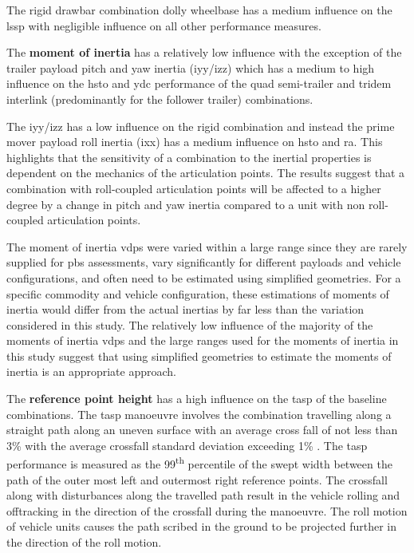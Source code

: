 The rigid drawbar combination dolly wheelbase has a medium influence on the \gls{lssp} with negligible influence on all other performance measures.

The \textbf{moment of inertia} has a relatively low influence with the exception of the trailer payload pitch and yaw inertia (\gls{iyy}/\gls{izz}) which has a medium to high influence on the \gls{hsto} and \gls{ydc} performance of the quad semi-trailer and tridem interlink (predominantly for the follower trailer) combinations. 

The \gls{iyy}/\gls{izz} has a low influence on the rigid combination and instead the prime mover payload roll inertia (\gls{ixx}) has a medium influence on \gls{hsto} and \gls{ra}. This highlights that the sensitivity of a combination to the inertial properties is dependent on the mechanics of the articulation points. The results suggest that a combination with roll-coupled articulation points will be affected to a higher degree by a change in pitch and yaw inertia compared to a unit with non roll-coupled articulation points.

The moment of inertia \glspl{vdp} were varied within a large range since they are rarely supplied for \gls{pbs} assessments, vary significantly for different payloads and vehicle configurations, and often need to be estimated using simplified geometries. For a specific commodity and vehicle configuration, these estimations of moments of inertia would differ from the actual inertias by far less than the variation considered in this study. The relatively low influence of the majority of the moments of inertia \glspl{vdp} and the large ranges used for the moments of inertia in this study suggest that using simplified geometries to estimate the moments of inertia is an appropriate approach.

The \textbf{reference point height} has a high influence on the \gls{tasp} of the baseline combinations. The \gls{tasp} manoeuvre involves the combination travelling along a straight path along an uneven surface with an average cross fall of not less than 3\% with the average crossfall standard deviation exceeding 1\% \cite{NationalTransportCommission2008}. The \gls{tasp} performance is measured as the 99\textsuperscript{th} percentile of the swept width between the path of the outer most left and outermost right reference points. The crossfall along with disturbances along the travelled path result in the vehicle rolling and offtracking in the direction of the crossfall during the manoeuvre. The roll motion of vehicle units causes the path scribed in the ground to be projected further in the direction of the roll motion. 

